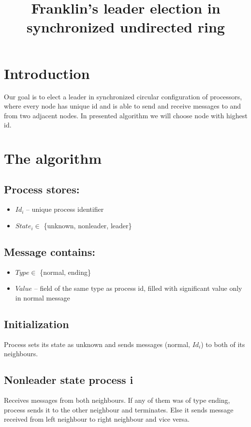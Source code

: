 \documentclass{article}
\title{Franklin’s leader election in synchronized undirected ring}
\date{}
\begin{document}
\maketitle

\section*{Introduction}
Our goal is to elect a leader in synchronized circular configuration of processors, where every node has unique id  and is able to send and receive messages to and from two adjacent nodes. In presented algorithm we will choose node with highest id.

\section*{The algorithm}
\subsection*{Process stores:}
\begin{itemize}
    \item $Id_{i}$ – unique process identifier
    \item $State_{i} \in$ \{unknown, nonleader, leader\}
\end{itemize}

\subsection*{Message contains:}
\begin{itemize}
    \item $Type \in$ \{normal, ending\}
    \item $Value$ – field of the same type as process id, filled with significant value only in normal message
\end{itemize}

\subsection*{Initialization}
Process sets its state as unknown and sends messages (normal, $Id_{i}$) to both of its neighbours.

\subsection*{Nonleader state process i}
Receives messages from both neighbours.\newline
If any of them was of type ending, process sends it to the other neighbour and terminates.\newline
Else it sends message received from left neighbour to right neighbour and vice versa.
\end{document}
